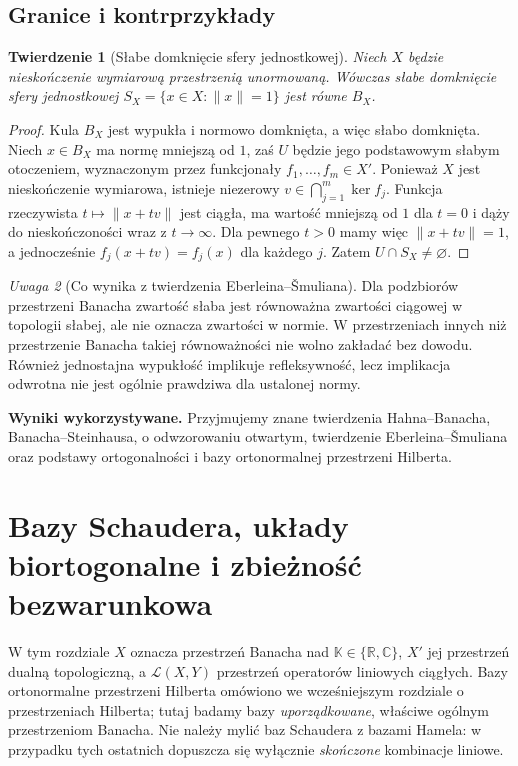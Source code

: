 \documentclass[11pt,a4paper]{article}
\numberwithin{equation}{section}
\theoremstyle{plain}
\newtheorem{twierdzenie}{Twierdzenie}[section]
\theoremstyle{definition}
\theoremstyle{remark}
\newtheorem{uwaga}[twierdzenie]{Uwaga}
\newcommand{\R}{\mathbb R}
\newcommand{\C}{\mathbb C}
\newcommand{\K}{\mathbb K}
\begin{document}
\subsection{Granice i kontrprzykłady}

\begin{twierdzenie}[Słabe domknięcie sfery jednostkowej]
\label{thm:sphere-weak-dense26}
Niech $X$ będzie nieskończenie wymiarową przestrzenią
unormowaną. Wówczas słabe domknięcie sfery jednostkowej
$S_X=\{x\in X:\|x\|=1\}$ jest równe $B_X$.
\end{twierdzenie}
\begin{proof}
Kula $B_X$ jest wypukła i normowo domknięta,
a więc słabo domknięta. Niech $x\in B_X$ ma normę mniejszą
od $1$, zaś $U$ będzie jego podstawowym słabym otoczeniem,
wyznaczonym przez funkcjonały $f_1,\ldots,f_m\in X'$.
Ponieważ $X$ jest nieskończenie wymiarowa, istnieje
niezerowy $v\in\bigcap_{j=1}^m\ker f_j$.
Funkcja rzeczywista $t\mapsto\|x+tv\|$ jest ciągła,
ma wartość mniejszą od $1$ dla $t=0$ i dąży do
nieskończoności wraz z $t\to\infty$.
Dla pewnego $t>0$ mamy więc $\|x+tv\|=1$,
a jednocześnie $f_j(x+tv)=f_j(x)$ dla każdego $j$.
Zatem $U\cap S_X\ne\varnothing$.
\end{proof}

\begin{uwaga}[Co wynika z twierdzenia Eberleina--\v Smuliana]
\label{rem:weak-compact-what26}
Dla podzbiorów przestrzeni Banacha zwartość słaba
jest równoważna zwartości ciągowej w topologii słabej,
ale nie oznacza
zwartości w normie. W przestrzeniach innych niż przestrzenie
Banacha takiej równoważności nie wolno zakładać bez dowodu.
Również jednostajna wypukłość implikuje refleksywność,
lecz implikacja odwrotna nie jest ogólnie prawdziwa dla
ustalonej normy.
\end{uwaga}


\setcounter{section}{26}
\noindent\textbf{Wyniki wykorzystywane.}
Przyjmujemy znane twierdzenia Hahna--Banacha,
Banacha--Steinhausa, o odwzorowaniu otwartym,
twierdzenie Eberleina--\v Smuliana oraz podstawy
ortogonalności i bazy ortonormalnej przestrzeni Hilberta.
\par\medskip
\section{Bazy Schaudera, układy biortogonalne i zbieżność bezwarunkowa}
\label{sec:bazy27}

W tym rozdziale $X$ oznacza przestrzeń Banacha nad $\K\in\{\R,\C\}$,
$X'$ jej przestrzeń dualną topologiczną, a $\mathcal L(X,Y)$
przestrzeń operatorów liniowych ciągłych. Bazy ortonormalne przestrzeni
Hilberta omówiono we wcześniejszym rozdziale o przestrzeniach Hilberta; tutaj badamy bazy
\emph{uporządkowane}, właściwe ogólnym przestrzeniom Banacha.
Nie należy mylić baz Schaudera z bazami Hamela: w przypadku tych
ostatnich dopuszcza się wyłącznie \emph{skończone} kombinacje liniowe.
\end{document}
